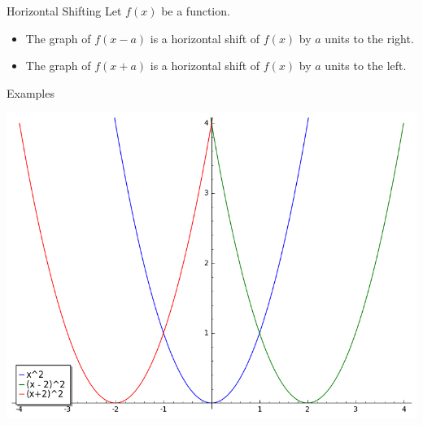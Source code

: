 \documentclass{beamer}
\theoremstyle{definition}
\begin{document}
\begin{frame}{Horizontal Shifting}
  Let $f(x)$ be a function.
  \begin{itemize}
    \item<3->
      The graph of $f(x - a)$ is a horizontal shift of $f(x)$ by $a$ units to the right.
    \item<4->
      The graph of $f(x + a)$ is a horizontal shift of $f(x)$ by $a$ units to the left.
  \end{itemize}
\end{frame}

\begin{frame}{Examples}
  \begin{center}
    \includegraphics[scale=0.5]{imgs/horizShifts.png}
  \end{center}
\end{frame}
\end{document}
